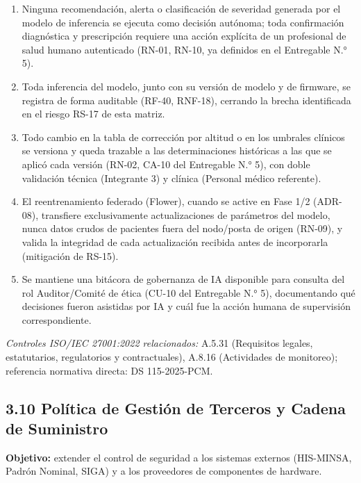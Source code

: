 \documentclass[11pt,a4paper]{article}
\providecommand{\tightlist}{%
  \setlength{\itemsep}{0pt}\setlength{\parskip}{0pt}}
\begin{document}
\begin{enumerate}
\def\labelenumi{\arabic{enumi}.}
\tightlist
\item
  Ninguna recomendación, alerta o clasificación de severidad generada por el modelo de inferencia se ejecuta como decisión autónoma; toda confirmación diagnóstica y prescripción requiere una acción explícita de un profesional de salud humano autenticado (RN-01, RN-10, ya definidos en el Entregable N.° 5).
\item
  Toda inferencia del modelo, junto con su versión de modelo y de firmware, se registra de forma auditable (RF-40, RNF-18), cerrando la brecha identificada en el riesgo RS-17 de esta matriz.
\item
  Todo cambio en la tabla de corrección por altitud o en los umbrales clínicos se versiona y queda trazable a las determinaciones históricas a las que se aplicó cada versión (RN-02, CA-10 del Entregable N.° 5), con doble validación técnica (Integrante 3) y clínica (Personal médico referente).
\item
  El reentrenamiento federado (Flower), cuando se active en Fase 1/2 (ADR-08), transfiere exclusivamente actualizaciones de parámetros del modelo, nunca datos crudos de pacientes fuera del nodo/posta de origen (RN-09), y valida la integridad de cada actualización recibida antes de incorporarla (mitigación de RS-15).
\item
  Se mantiene una bitácora de gobernanza de IA disponible para consulta del rol Auditor/Comité de ética (CU-10 del Entregable N.° 5), documentando qué decisiones fueron asistidas por IA y cuál fue la acción humana de supervisión correspondiente.
\end{enumerate}

\emph{Controles ISO/IEC 27001:2022 relacionados:} A.5.31 (Requisitos legales, estatutarios, regulatorios y contractuales), A.8.16 (Actividades de monitoreo); referencia normativa directa: DS 115-2025-PCM.

\subsection{3.10 Política de Gestión de Terceros y Cadena de Suministro}\label{poluxedtica-de-gestiuxf3n-de-terceros-y-cadena-de-suministro}

\textbf{Objetivo:} extender el control de seguridad a los sistemas externos (HIS-MINSA, Padrón Nominal, SIGA) y a los proveedores de componentes de hardware.
\end{document}
